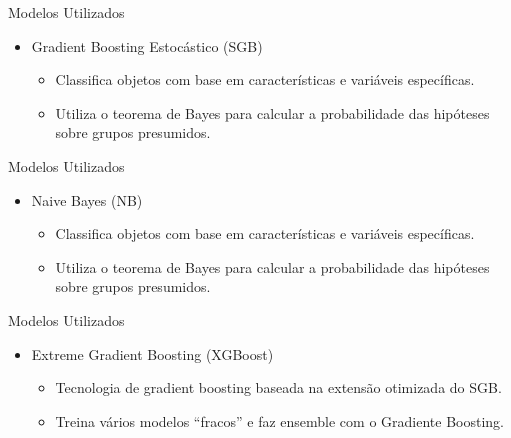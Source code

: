 \begin{frame}{Modelos Utilizados}
	\begin{itemize}
		\item Gradient Boosting Estocástico (SGB)
		\begin{itemize}
			\item Classifica objetos com base em características e variáveis específicas.
			\item Utiliza o teorema de Bayes para calcular a probabilidade das hipóteses sobre grupos presumidos.
		\end{itemize}
	\end{itemize}
\end{frame}

\begin{frame}{Modelos Utilizados}
	\begin{itemize}
		\item Naive Bayes (NB)
		\begin{itemize}
			\item Classifica objetos com base em características e variáveis específicas.
			\item Utiliza o teorema de Bayes para calcular a probabilidade das hipóteses sobre grupos presumidos.
		\end{itemize}
	\end{itemize}
\end{frame}

\begin{frame}{Modelos Utilizados}
	\begin{itemize}
		\item Extreme Gradient Boosting (XGBoost)
		\begin{itemize}
			\item Tecnologia de gradient boosting baseada na extensão otimizada do SGB.
			\item Treina vários modelos “fracos” e faz ensemble com o Gradiente Boosting.
		\end{itemize}
	\end{itemize}
\end{frame}





